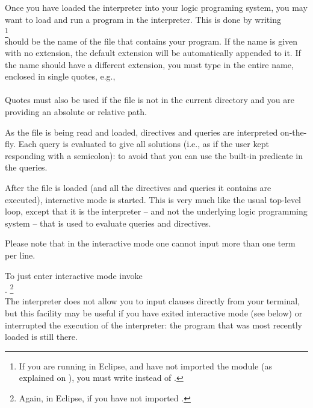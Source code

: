 


Once you have loaded the interpreter into your logic programing system, you
may want to load and run a program in the interpreter. This is done by
writing\\
\ind{}%
\footnote{
  If you are running in Eclipse, and have not imported the module 
  (as explained on ), you must write 
  instead of .
}\\
 should be the name of the file that contains your program.
If the name is given with no extension, the default extension
 will be automatically appended to it.%
%
If the name should have a different extension, you must type in the entire
name, enclosed in single quotes, e.g.,\\
\ind{}\\
Quotes must also be used if the file is not in the current directory and you
are providing an absolute or relative path.

As the file is being read and loaded, directives and queries are interpreted
on-the-fly. Each query is evaluated to give all solutions (i.e., as if the
user kept responding with a semicolon): to avoid that you can use the
built-in predicate  in the queries.
\vfill %


After the file is loaded (and all the directives and queries it contains are
executed), interactive mode is started.  This is very much like the usual
top-level loop, except that it is the interpreter -- and not the
underlying logic programming system -- that is used to evaluate queries and
directives.

Please note that in the interactive mode one cannot input more than one term
per line.

To just enter interactive mode invoke\\
\ind{}.%
\footnote{Again,  in Eclipse, if you have not imported
  .}\\
 The interpreter does not allow you to input clauses directly from your
 terminal, but this facility may be useful if you have exited interactive
 mode (see below) or interrupted the execution of the interpreter: the
 program that was most recently loaded is still there.

